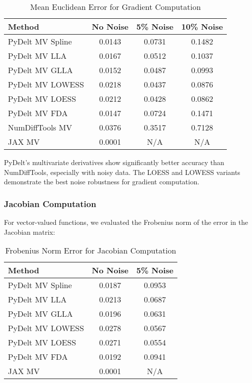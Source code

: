 \documentclass[conference]{IEEEtran}
\begin{document}
\begin{table}[!t]
\caption{Mean Euclidean Error for Gradient Computation}
\label{tab:gradient}
\centering
\begin{tabular}{lccc}
\toprule
\textbf{Method} & \textbf{No Noise} & \textbf{5\% Noise} & \textbf{10\% Noise} \\
\midrule
PyDelt MV Spline & 0.0143 & 0.0731 & 0.1482 \\
PyDelt MV LLA & 0.0167 & 0.0512 & 0.1037 \\
PyDelt MV GLLA & 0.0152 & 0.0487 & 0.0993 \\
PyDelt MV LOWESS & 0.0218 & 0.0437 & 0.0876 \\
PyDelt MV LOESS & 0.0212 & 0.0428 & 0.0862 \\
PyDelt MV FDA & 0.0147 & 0.0724 & 0.1471 \\
NumDiffTools MV & 0.0376 & 0.3517 & 0.7128 \\
JAX MV & 0.0001 & N/A & N/A \\
\bottomrule
\end{tabular}
\end{table}

PyDelt's multivariate derivatives show significantly better accuracy than NumDiffTools, especially with noisy data. The LOESS and LOWESS variants demonstrate the best noise robustness for gradient computation.

\subsubsection{Jacobian Computation}

For vector-valued functions, we evaluated the Frobenius norm of the error in the Jacobian matrix:

\begin{table}[!t]
\caption{Frobenius Norm Error for Jacobian Computation}
\label{tab:jacobian}
\centering
\begin{tabular}{lcc}
\toprule
\textbf{Method} & \textbf{No Noise} & \textbf{5\% Noise} \\
\midrule
PyDelt MV Spline & 0.0187 & 0.0953 \\
PyDelt MV LLA & 0.0213 & 0.0687 \\
PyDelt MV GLLA & 0.0196 & 0.0631 \\
PyDelt MV LOWESS & 0.0278 & 0.0567 \\
PyDelt MV LOESS & 0.0271 & 0.0554 \\
PyDelt MV FDA & 0.0192 & 0.0941 \\
JAX MV & 0.0001 & N/A \\
\bottomrule
\end{tabular}
\end{table}
\end{document}
